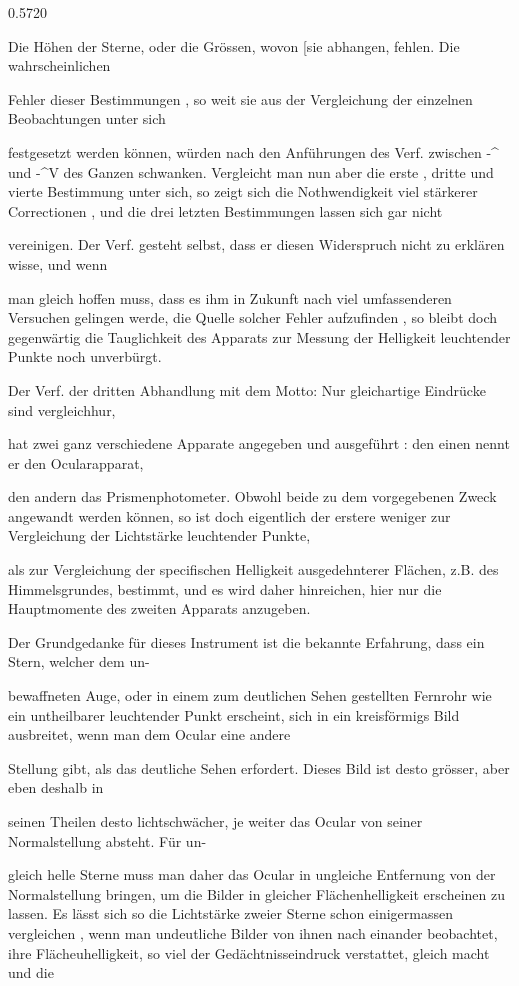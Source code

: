 \documentclass[10pt,a4paper]{article}
\begin{document}
0.5720

Die Höhen der Sterne, oder die Grössen, wovon [sie abhangen, fehlen. Die wahrscheinlichen

Fehler dieser Bestimmungen , so weit sie aus der Vergleichung der einzelnen Beobachtungen unter sich

festgesetzt werden können, würden nach den Anführungen des Verf. zwischen -\textasciicircum{} und -\textasciicircum{}V des Ganzen schwanken. Vergleicht man nun aber die erste , dritte und vierte Bestimmung unter sich, so zeigt sich die Nothwendigkeit viel stärkerer Correctionen , und die drei letzten Bestimmungen lassen sich gar nicht

vereinigen. Der Verf. gesteht selbst, dass er diesen Widerspruch nicht zu erklären wisse, und wenn

man gleich hoffen muss, dass es ihm in Zukunft nach viel umfassenderen Versuchen gelingen werde, die Quelle solcher Fehler aufzufinden , so bleibt doch gegenwärtig die Tauglichkeit des Apparats zur Messung der Helligkeit leuchtender Punkte noch unverbürgt.

Der Verf. der dritten Abhandlung mit dem Motto: Nur gleichartige Eindrücke sind vergleichhur,

hat zwei ganz verschiedene Apparate angegeben und ausgeführt : den einen nennt er den Ocularapparat,

den andern das Prismenphotometer. Obwohl beide zu dem vorgegebenen Zweck angewandt werden können, so ist doch eigentlich der erstere weniger zur Vergleichung der Lichtstärke leuchtender Punkte,

als zur Vergleichung der specifischen Helligkeit ausgedehnterer Flächen, z.B. des Himmelsgrundes, bestimmt, und es wird daher hinreichen, hier nur die Hauptmomente des zweiten Apparats anzugeben.

Der Grundgedanke für dieses Instrument ist die bekannte Erfahrung, dass ein Stern, welcher dem un-

bewaffneten Auge, oder in einem zum deutlichen Sehen gestellten Fernrohr wie ein untheilbarer leuchtender Punkt erscheint, sich in ein kreisförmigs Bild ausbreitet, wenn man dem Ocular eine andere

Stellung gibt, als das deutliche Sehen erfordert. Dieses Bild ist desto grösser, aber eben deshalb in

seinen Theilen desto lichtschwächer, je weiter das Ocular von seiner Normalstellung absteht. Für un-

gleich helle Sterne muss man daher das Ocular in ungleiche Entfernung von der Normalstellung bringen, um die Bilder in gleicher Flächenhelligkeit erscheinen zu lassen. Es lässt sich so die Lichtstärke zweier Sterne schon einigermassen vergleichen , wenn man undeutliche Bilder von ihnen nach einander beobachtet, ihre Flächeuhelligkeit, so viel der Gedächtnisseindruck verstattet, gleich macht und die
\end{document}
